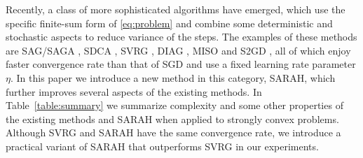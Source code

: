 \documentclass{article}
\newcommand{\new}[1]{\textcolor{red}{#1}}
\begin{document}
Recently, a class of more sophisticated
algorithms have emerged, which use the specific finite-sum form of \eqref{eq:problem} and combine some deterministic and stochastic aspects to reduce variance of the steps.  The examples of these methods  are 
SAG/SAGA \cite{SAG, SAGA}, SDCA \cite{SDCA}, SVRG \cite{SVRG, Xiao2014}, DIAG \cite{mokhtari2017double}, MISO \cite{mairal2013optimization}
and S2GD \cite{S2GD}, all of which enjoy  faster convergence rate than that of SGD and use a fixed learning rate parameter $\eta$. In this paper we introduce a new method in this category, SARAH, which further improves several aspects of the existing methods. 
In Table~\ref{table:summary} we summarize complexity and some other properties of the existing methods and SARAH when applied to  strongly convex problems.
Although SVRG and SARAH have the same convergence rate, we introduce a practical variant of SARAH that outperforms SVRG in our experiments. 
\end{document}
